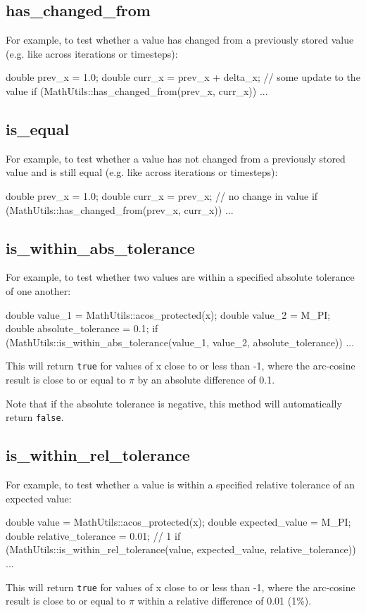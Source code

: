 \documentclass[11pt,fleqn]{report}
\begin{document}
\subsection{has\_changed\_from}
For example, to test whether a value has changed from a previously stored value
(e.g. like across iterations or timesteps):
\begin{code}
double prev_x = 1.0;
double curr_x = prev_x + delta_x; // some update to the value
if (MathUtils::has_changed_from(prev_x, curr_x)) {
...
}
\end{code}

\subsection{is\_equal}
For example, to test whether a value has not changed from a previously stored value
and is still equal (e.g. like across iterations or timesteps):
\begin{code}
double prev_x = 1.0;
double curr_x = prev_x; // no change in value
if (MathUtils::has_changed_from(prev_x, curr_x)) {
...
}
\end{code}

\subsection{is\_within\_abs\_tolerance}
For example, to test whether two values are within a specified absolute
tolerance of one another:
\begin{code}
double value_1 = MathUtils::acos_protected(x);
double value_2 = M_PI;
double absolute_tolerance = 0.1;
if (MathUtils::is_within_abs_tolerance(value_1,
 value_2,
 absolute_tolerance)) {
...
}
\end{code}
This will return \texttt{true} for values of x close to or less than -1, where the
arc-cosine result is close to or equal to $\pi$ by an absolute difference
of 0.1.

Note that if the absolute tolerance is negative, this method will
automatically return \texttt{false}.

\subsection{is\_within\_rel\_tolerance}
For example, to test whether a value is within a specified relative
tolerance of an expected value:
\begin{code}
double value = MathUtils::acos_protected(x);
double expected_value = M_PI;
double relative_tolerance = 0.01; // 1%
if (MathUtils::is_within_rel_tolerance(value,
 expected_value,
 relative_tolerance)) {
...
}
\end{code}
This will return \texttt{true} for values of x close to or less than -1, where the
arc-cosine result is close to or equal to $\pi$ within a relative difference
of 0.01 (1\%).
\end{document}
